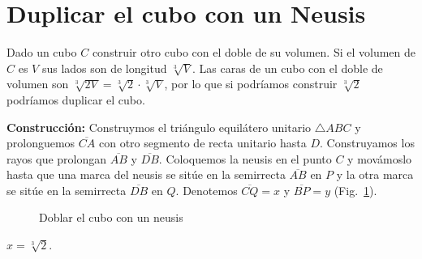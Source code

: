 \section{Duplicar el cubo con un Neusis}\label{s.neusis-doubling}

Dado un cubo $C$ construir otro cubo con el doble de su volumen. Si el volumen de $C$ es $V$ sus lados son de longitud $\sqrt[3]{V}$. Las caras de un cubo con el doble de volumen son $\sqrt[3]{2 V}=\sqrt[3]{2}\cdot\sqrt[3]{V}$, por lo que si podríamos construir $\sqrt[3]{2}$ podríamos duplicar el cubo.

\noindent\textbf{Construcción:}
Construymos el triángulo equilátero unitario $\triangle ABC$ y prolonguemos $\overline{CA}$ con otro segmento de recta unitario hasta $D$. Construyamos los rayos que prolongan $\overline{AB}$ y $\overline{DB}$. Coloquemos la neusis en el punto $C$ y movámoslo hasta que una marca del neusis se sitúe en la semirrecta $\overline{AB}$ en $P$ y la otra marca se sitúe en la semirrecta $\overline{DB}$ en $Q$. Denotemos $\overline{CQ}=x$ y $\overline{BP}=y$ (Fig.~\ref{f.double-neusis}).

\begin{figure}[b]
\begin{center}
\end{center}
\caption{Doblar el cubo con un neusis}\label{f.double-neusis}
\end{figure}

\begin{theorem}
$x=\sqrt[3]{2}$.
\end{theorem}

